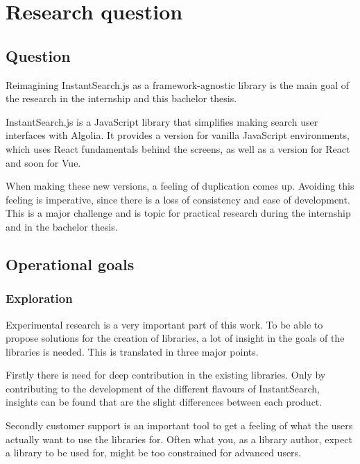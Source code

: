 
\chapter{Research question} %
\label{chp:research_question}
\section{Question}
\label{sec:question}

Reimagining InstantSearch.js as a framework-agnostic library is the main goal of the research in the internship and this bachelor thesis.

InstantSearch.js is a JavaScript library that simplifies making search user interfaces with Algolia. It provides a version for vanilla JavaScript environments, which uses React fundamentals behind the screens, as well as a version for React and soon for Vue.

When making these new versions, a feeling of duplication comes up. Avoiding this feeling is imperative, since there is a loss of consistency and ease of development. This is a major challenge and is topic for practical research during the internship and in the bachelor thesis.

\section{Operational goals}
\label{sec:operational_goals}

\subsection{Exploration}

Experimental research is a very important part of this work. To be able to propose solutions for the creation of libraries, a lot of insight in the goals of the libraries is needed. This is translated in three major points. 

Firstly there is need for deep contribution in the existing libraries. Only by contributing to the development of the different flavours of InstantSearch, insights can be found that are the slight differences between each product.

Secondly customer support is an important tool to get a feeling of what the users actually want to use the libraries for. Often what you, as a library author, expect a library to be used for, might be too constrained for advanced users.

